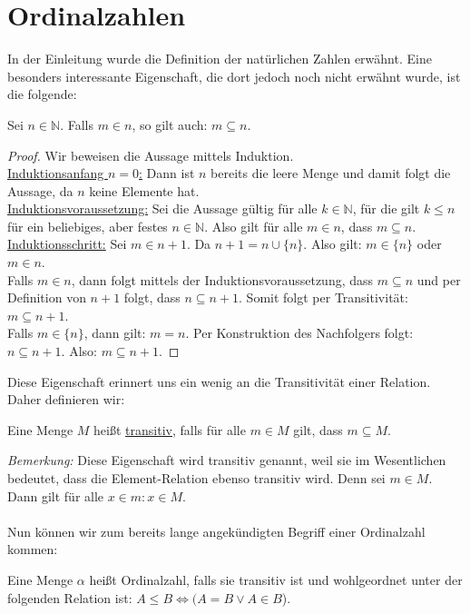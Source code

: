\documentclass[11pt]{scrartcl}
\newcommand{\N}{\mathbb{N}}
\begin{document}
\section{Ordinalzahlen}
In der Einleitung wurde die Definition der natürlichen Zahlen erwähnt. Eine besonders interessante Eigenschaft, die dort jedoch noch nicht erwähnt wurde, ist die folgende: 
\begin{lemma}
	Sei $n\in\N$. Falls $m\in n$, so gilt auch: $m \subseteq n$.
\end{lemma}
\begin{proof}
Wir beweisen die Aussage mittels Induktion. \\
\underline{Induktionsanfang $n=0$:} Dann ist $n$ bereits die leere Menge und damit folgt die Aussage, da $n$ keine Elemente hat. \\
\underline{Induktionsvoraussetzung:} Sei die Aussage gültig für alle $k\in\N$, für die gilt $k\leq n$ für ein beliebiges, aber festes $n\in\N$. Also gilt für alle $m \in n$, dass $m \subseteq n$. \\
\underline{Induktionsschritt:} Sei $m\in n+1$. Da $n+1= n \cup \{ n \}$. Also gilt: $m\in \{ n\}$ oder $m\in n$.\\ Falls $m\in n$, dann folgt mittels der Induktionsvoraussetzung, dass $m \subseteq n$ und per Definition von $n+1$ folgt, dass $n \subseteq n+1$. Somit folgt per Transitivität: $m \subseteq n+1$. \\
Falls $m\in \{ n\}$, dann gilt: $m=n$. Per Konstruktion des Nachfolgers folgt: $ n \subseteq n+1$. Also: $m \subseteq n+1$.
\end{proof}
Diese Eigenschaft erinnert uns ein wenig an die Transitivität einer Relation. Daher definieren wir:
\begin{definition}
	Eine Menge $M$ heißt \underline{transitiv}, falls für alle $m\in M$ gilt, dass $m\subseteq M$.
\end{definition}
\noindent\textit{Bemerkung:} Diese Eigenschaft wird transitiv genannt, weil sie im Wesentlichen bedeutet, dass die Element-Relation ebenso transitiv wird. Denn sei $m\in M$. Dann gilt für alle $x\in m: x\in M$.\\\phantom{Test}\\ Nun können wir zum bereits lange angekündigten Begriff einer Ordinalzahl kommen:
\begin{definition}
	Eine Menge $\alpha$ heißt Ordinalzahl, falls sie transitiv ist und wohlgeordnet unter der folgenden Relation ist: $A \leq B \iff (A = B \lor A \in B$).
\end{definition}
\end{document}
